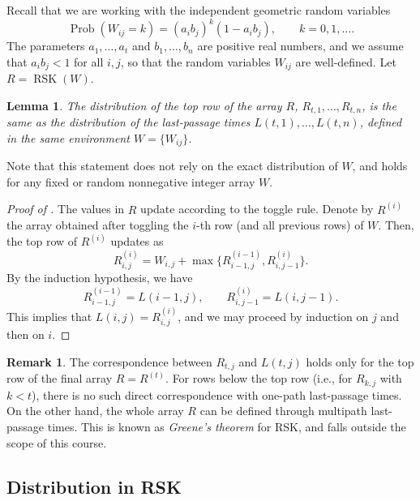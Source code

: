 \documentclass[letterpaper,11pt,oneside,reqno]{book}
\numberwithin{equation}{chapter}  %
\newtheorem{lemma}[proposition]{Lemma}
\theoremstyle{definition}
\newtheorem{remark}[proposition]{Remark}
\begin{document}
Recall that we are working with the independent geometric random variables
\begin{equation*}
	\operatorname{Prob}\left( W_{ij}=k \right)=(a_ib_j)^k(1-a_ib_j),\qquad k=0,1,\ldots.
\end{equation*}
The parameters $a_1,\ldots,a_t $ and $b_1,\ldots,b_n$ are positive real numbers, and we assume that $a_i b_j<1$ for all $i,j$,
so that the random variables $W_{ij}$ are well-defined.
Let $R=\operatorname{RSK}(W)$.
\begin{lemma}
	\label{lecture14:lemma:L_as_R}
	The distribution of the top row of the array $R$,
	$R_{t,1},\ldots,R_{t,n}$,
	is the same as the distribution of the last-passage times
	$L(t,1),\ldots,L(t,n)$, defined in the same environment $W=\{W_{ij}\}$.
\end{lemma}
Note that this statement does not rely on the exact distribution of $W$,
and holds for any fixed or random nonnegative integer array $W$.
\begin{proof}[Proof of ]
	The values in $R$ update according to the toggle rule.
	Denote by $R^{(i)}$ the array obtained after toggling the $i$-th row (and all previous rows) of $W$.
	Then, the top row of $R^{(i)}$ updates as
	\begin{equation*}
		R^{(i)}_{i,j}=
		W_{i,j}+\max\big\{R^{(i-1)}_{i-1,j},
		R^{(i)}_{i,j-1}\big\}.
	\end{equation*}
	By the induction hypothesis, we have
	\begin{equation*}
		R^{(i-1)}_{i-1,j}=L(i-1,j),\qquad R^{(i)}_{i,j-1}=L(i,j-1).
	\end{equation*}
	This implies that $L(i,j)=R^{(i)}_{i,j}$,
	and we may proceed by induction on $j$ and then on $i$.
\end{proof}

\begin{remark}
	The correspondence between $R_{t,j}$ and $L(t,j)$
	holds only for the top row of the final array
	$R=R^{(t)}$. For rows below the top row (i.e., for
	$R_{k,j}$ with $k < t$), there is no such direct
	correspondence with one-path last-passage times.
	On the other hand, the whole array $R$ can be defined
	through multipath last-passage times. This is
	known as \emph{Greene's theorem} \cite{sagan2001symmetric} for RSK,
	and falls outside the scope of this course.
\end{remark}

\subsection{Distribution in RSK}
\label{lecture14:sub:distribution_RSK}
\end{document}
